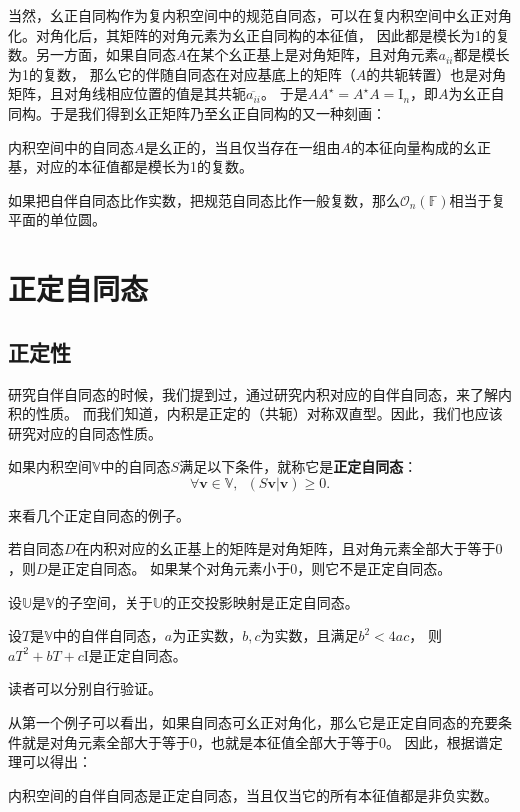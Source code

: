 \documentclass[12pt,UTF8,fontset=none]{ctexbook}
\begin{document}
当然，幺正自同构作为复内积空间中的规范自同态，可以在复内积空间中幺正对角化。对角化后，其矩阵的对角元素为幺正自同构的本征值，
因此都是模长为1的复数。另一方面，如果自同态$A$在某个幺正基上是对角矩阵，且对角元素$a_{ii}$都是模长为1的复数，
那么它的伴随自同态在对应基底上的矩阵（$A$的共轭转置）也是对角矩阵，且对角线相应位置的值是其共轭$\overline{a_{ii}}$。
于是$A A^\star = A^\star A = \mathrm{I}_n$，即$A$为幺正自同构。于是我们得到幺正矩阵乃至幺正自同构的又一种刻画：
\begin{pp}\label{pp:8_10}
    内积空间中的自同态$A$是幺正的，当且仅当存在一组由$A$的本征向量构成的幺正基，对应的本征值都是模长为1的复数。
\end{pp}
如果把自伴自同态比作实数，把规范自同态比作一般复数，那么$\mathcal{O}_n(\mathbb{F})$相当于复平面的单位圆。

\section{正定自同态}
\subsection{正定性}
研究自伴自同态的时候，我们提到过，通过研究内积对应的自伴自同态，来了解内积的性质。
而我们知道，内积是正定的（共轭）对称双直型。因此，我们也应该研究对应的自同态性质。
\begin{df}\label{df:8_4}
    如果内积空间$\mathbb{V}$中的自同态$S$满足以下条件，就称它是\textbf{正定自同态}：
    $$ \forall \mathbf{v} \in \mathbb{V}, \,\,\, (S\mathbf{v} | \mathbf{v}) \geqslant 0.$$
\end{df}

来看几个正定自同态的例子。

若自同态$D$在内积对应的幺正基上的矩阵是对角矩阵，且对角元素全部大于等于$0$，则$D$是正定自同态。
如果某个对角元素小于$0$，则它不是正定自同态。

设$\mathbb{U}$是$\mathbb{V}$的子空间，关于$\mathbb{U}$的正交投影映射是正定自同态。

设$T$是$\mathbb{V}$中的自伴自同态，$a$为正实数，$b, c$为实数，且满足$b^2 < 4ac$，
则$aT^2 + bT + c\mathrm{I}$是正定自同态。

读者可以分别自行验证。

从第一个例子可以看出，如果自同态可幺正对角化，那么它是正定自同态的充要条件就是对角元素全部大于等于$0$，也就是本征值全部大于等于$0$。
因此，根据谱定理可以得出：
\begin{pp}\label{pp:8_10_1}
内积空间的自伴自同态是正定自同态，当且仅当它的所有本征值都是非负实数。
\end{pp}
\end{document}
